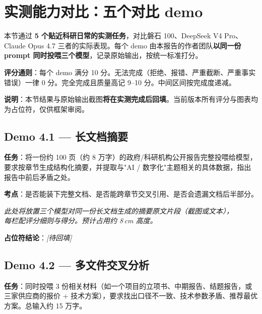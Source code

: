\section{实测能力对比：五个对比 demo}
\label{sec:benchmarks}

本节通过 \textbf{5 个贴近科研日常的实测任务}，对比磐石 100、DeepSeek V4 Pro、Claude Opus 4.7 三者的实际表现。每个 demo 由本报告的作者团队\textbf{以同一份 prompt 同时投喂三个模型}，记录原始输出，按统一标准打分。

\medskip
\textbf{评分通则}：每个 demo 满分 10 分。无法完成（拒绝、报错、严重截断、严重事实错误）一律 0 分。完全完成且质量高记 9--10 分。中间区间按完成度递减。

\medskip
\textbf{说明}：本节结果与原始输出截图\textbf{将在实测完成后回填}。当前版本所有评分与图表均为占位符，仅供框架审阅。

\subsection{Demo 4.1 — 长文档摘要}

\textbf{任务}：将一份约 100 页（约 8 万字）的政府/科研机构公开报告完整投喂给模型，要求按章节生成结构化摘要，并提取与"AI / 数字化"主题相关的具体数据，指出报告中前后矛盾之处。

\textbf{考点}：是否能装下完整文档、是否能跨章节交叉引用、是否会遗漏文档后半部分。

\begin{placeholder}[title={占位符 4.1：长文档摘要原始输出三栏对比}]
\vspace{1.2cm}
\centering\textit{此处将放置三个模型对同一份长文档生成的摘要原文片段（截图或文本），\\
每栏配评分细则与得分。预计占用约 8\,cm 高度。}
\vspace{1.2cm}
\end{placeholder}

\textbf{占位符结论}：\textit{[待回填]}

\subsection{Demo 4.2 — 多文件交叉分析}

\textbf{任务}：同时投喂 3 份相关材料（如一个项目的立项书、中期报告、结题报告，或三家供应商的报价 + 技术方案），要求找出口径不一致、技术参数矛盾、推荐最优方案。总输入约 15 万字。


